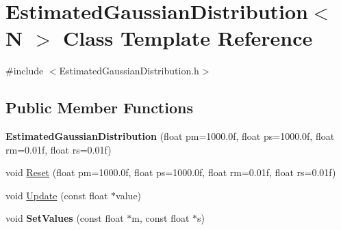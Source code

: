 \hypertarget{classEstimatedGaussianDistribution}{}\section{Estimated\+Gaussian\+Distribution$<$ N $>$ Class Template Reference}
\label{classEstimatedGaussianDistribution}


{\ttfamily \#include $<$Estimated\+Gaussian\+Distribution.\+h$>$}

\subsection*{Public Member Functions}
\begin{DoxyCompactItemize}
\item 
\hypertarget{classEstimatedGaussianDistribution_afe5b507d908e2669fe8ea708a87e7c3b}{}{\bfseries Estimated\+Gaussian\+Distribution} (float pm=1000.\+0f, float ps=1000.\+0f, float rm=0.\+01f, float rs=0.\+01f)\label{classEstimatedGaussianDistribution_afe5b507d908e2669fe8ea708a87e7c3b}

\item 
void \hyperlink{classEstimatedGaussianDistribution_a2be4f792f6916c45825801980f648e9a}{Reset} (float pm=1000.\+0f, float ps=1000.\+0f, float rm=0.\+01f, float rs=0.\+01f)
\item 
void \hyperlink{classEstimatedGaussianDistribution_a340e3a01f89d62ddab06a0dbc8e9fe3c}{Update} (const float $\ast$value)
\item 
\hypertarget{classEstimatedGaussianDistribution_a7d2ccd30d2252f59c37a810a986e78a0}{}void {\bfseries Set\+Values} (const float $\ast$m, const float $\ast$s)\label{classEstimatedGaussianDistribution_a7d2ccd30d2252f59c37a810a986e78a0}

\end{DoxyCompactItemize}
